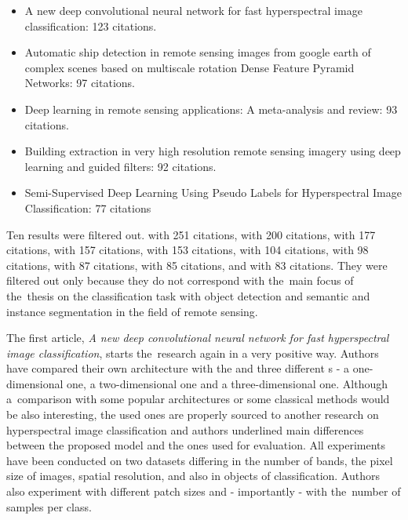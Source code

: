 \begin{itemize}
	\item A new deep convolutional neural network for fast hyperspectral image classification: 123 citations.  \cite{cnn-hs-class}
	\item Automatic ship detection in remote sensing images from google earth of complex scenes based on multiscale rotation Dense Feature Pyramid Networks: 97 citations. \cite{ship-rdfpn}
	\item Deep learning in remote sensing applications: A meta-analysis and review: 93 citations. \cite{dl-remote-sensing-review}
	\item Building extraction in very high resolution remote sensing imagery using deep learning and guided filters: 92 citations. \cite{res-u-net}
	\item Semi-Supervised Deep Learning Using Pseudo Labels for Hyperspectral Image Classification: 77 citations \cite{semi-supervised-hyperspectral}
\end{itemize}

Ten results were filtered out. \cite{dl-for-cv} with 251 citations, \cite{ir-image-fusion} with 200 citations, \cite{review-ml-in-rs} with 177 citations, \cite{rf-knn-svm-for-lc} with 157 citations, \cite{review-ml-agriculture} with 153 citations, \cite{review-uav-applications} with 104 citations, \cite{review-survey-dl} with 98 citations, \cite{dl-medicine-preprocessing} with 87 citations, \cite{state-of-the-art-ann} with 85 citations, and \cite{lc-2-0} with 83 citations. They were filtered out only because they do not correspond with the~main focus of the~thesis on the classification task with object detection and semantic and instance segmentation in the field of remote sensing.

The first article, \textit{A new deep convolutional neural network for fast hyperspectral image classification}, starts the~research again in a very positive way. Authors have compared their own architecture with the  and three different s - a one-dimensional one, a two-dimensional one and a three-dimensional one. Although a~comparison with some popular architectures or some classical  methods would be also interesting, the used ones are properly sourced to another research on hyperspectral image classification and authors underlined main differences between the proposed model and the ones used for evaluation. All experiments have been conducted on two datasets differing in the number of bands, the pixel size of images, spatial resolution, and also in objects of classification. Authors also experiment with different patch sizes and - importantly - with the~number of samples per class.

